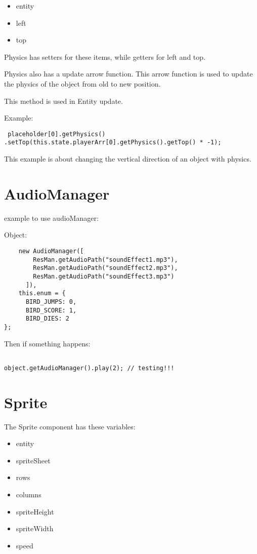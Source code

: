 \begin{itemize}
	\item entity
    \item left
    \item top
\end{itemize}

Physics has setters for these items, while getters for left and top.

Physics also has a update arrow function. This arrow function is used to update the physics of the object from old to new position. 

This method is used in Entity update.
\newpage

Example:

\begin{lstlisting}
 placeholder[0].getPhysics()
.setTop(this.state.playerArr[0].getPhysics().getTop() * -1);
\end{lstlisting}

This example is about changing the vertical direction of an object with physics.

\section{AudioManager}
example to use audioManager:

Object:
\begin{lstlisting}
    new AudioManager([
        ResMan.getAudioPath("soundEffect1.mp3"),
        ResMan.getAudioPath("soundEffect2.mp3"),
        ResMan.getAudioPath("soundEffect3.mp3")
      ]),    
    this.enum = {
      BIRD_JUMPS: 0,
      BIRD_SCORE: 1,
      BIRD_DIES: 2
};
\end{lstlisting}

Then if something happens:
\begin{lstlisting}

object.getAudioManager().play(2); // testing!!!
\end{lstlisting}


\section{Sprite}

The Sprite component has these variables:
\begin{itemize}
	\item entity
    \item spriteSheet
    \item rows
    \item columns
    \item spriteHeight
    \item spriteWidth
    \item speed
\end{itemize}

